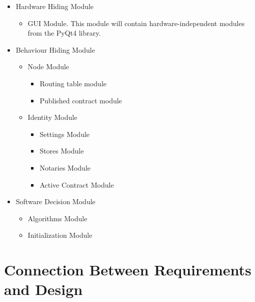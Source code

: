 \documentclass{article}
\begin{document}
\begin{itemize}
\item
Hardware Hiding Module
\begin{itemize}
\item
GUI Module. This module will contain hardware-independent modules from the PyQt4 library.
\end{itemize}

\item
Behaviour Hiding Module
\begin{itemize}


\item
Node Module
\begin{itemize}
\item
Routing table module
\item
Published contract module
\end{itemize}


\item
Identity Module
\begin{itemize}
\item
Settings Module

\item
Stores Module

\item
Notaries Module

\item
Active Contract Module
\end{itemize} %

\end{itemize} %

\item
Software Decision Module %
\begin{itemize}
\item
Algorithms Module

\item
Initialization Module
\end{itemize} %

\end{itemize} %





\section*{Connection Between Requirements and Design}
\end{document}
